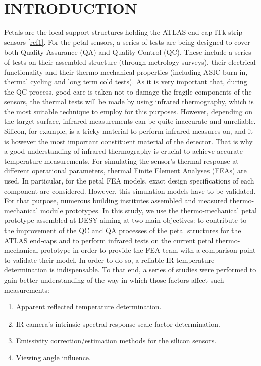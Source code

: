 \pagestyle{introduction}

\section*{\uppercase{Introduction}}\label{intro}
	\bigskip
	\bigskip
	Petals are the local support structures holding the ATLAS end-cap ITk strip sensors \ref{ref1}. For the petal sensors, a series of tests are being designed to cover both Quality Assurance (QA) and Quality Control (QC). These include a series of tests on their assembled structure (through metrology surveys), their electrical functionality and their thermo-mechanical properties (including ASIC burn in, thermal cycling and long term cold tests). 
	As it is very important that, during the QC process, good care is taken not to damage the fragile components of the sensors, the thermal tests will be made by using infrared thermography, which is the most suitable technique to employ for this purposes. However, depending on the target surface, infrared measurements can be quite inaccurate and unreliable. Silicon, for example, is a tricky material to perform infrared measures on, and it is however the most important constituent material of the detector. That is why a good understanding of infrared thermography is crucial to achieve accurate temperature measurements.
	For simulating the sensor's thermal response at different operational parameters, thermal Finite Element Analyses (FEAs) are used. In particular, for the petal FEA models, exact design specifications of each component are considered. However, this simulation models have to be validated. For that purpose, numerous building institutes assembled and measured thermo-mechanical module prototypes.
	In this study, we use the thermo-mechanical petal prototype assembled at DESY aiming at two main objectives: to contribute to the improvement of the QC and QA processes of the petal structures for the ATLAS end-caps and to perform infrared tests on the current petal thermo-mechanical prototype in order to provide the FEA team with a comparison point to validate their model. In order to do so, a reliable IR temperature determination is indispensable. To that end, a series of studies were performed to gain better understanding of the way in which those factors affect such measurements:
		
	\begin{enumerate}
		\item Apparent reflected temperature determination.
		\item IR camera’s intrinsic spectral response scale factor determination.
		\item Emissivity correction/estimation methods for the silicon sensors.
		\item Viewing angle influence.
	\end{enumerate}
	
